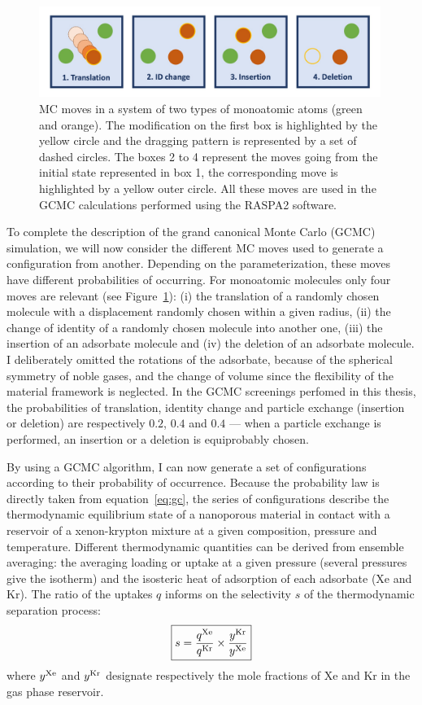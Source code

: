 \documentclass[main.tex]{subfiles}
\begin{document}
\begin{figure}[ht]
  \centering
  \includegraphics[width=0.99\textwidth]{figures/2-thermo/MC_moves.jpg}
  \caption{MC moves in a system of two types of monoatomic atoms (green and orange). The modification on the first box is highlighted by the yellow circle and the dragging pattern is represented by a set of dashed circles. The boxes 2 to 4 represent the moves going from the initial state represented in box 1, the corresponding move is highlighted by a yellow outer circle. All these moves are used in the GCMC calculations performed using the RASPA2 software. }\label{fgr:mc}
\end{figure}

To complete the description of the grand canonical Monte Carlo (GCMC) simulation, we will now consider the different MC moves used to generate a configuration from another. Depending on the parameterization, these moves have different probabilities of occurring. For monoatomic molecules only four moves are relevant (see Figure~\ref{fgr:mc}): (i) the translation of a randomly chosen molecule with a displacement randomly chosen within a given radius, (ii) the change of identity of a randomly chosen molecule into another one, (iii) the insertion of an adsorbate molecule and (iv) the deletion of an adsorbate molecule. I deliberately omitted the rotations of the adsorbate, because of the spherical symmetry of noble gases, and the change of volume since the flexibility of the material framework is neglected. In the GCMC screenings perfomed in this thesis, the probabilities of translation, identity change and particle exchange (insertion or deletion) are respectively $0.2$, $0.4$ and $0.4$ --- when a particle exchange is performed, an insertion or a deletion is equiprobably chosen.

By using a GCMC algorithm, I can now generate a set of configurations according to their probability of occurrence. Because the probability law is directly taken from equation~\ref{eq:gc}, the series of configurations describe the thermodynamic equilibrium state of a nanoporous material in contact with a reservoir of a xenon-krypton mixture at a given composition, pressure and temperature. Different thermodynamic quantities can be derived from ensemble averaging: the averaging loading or uptake at a given pressure (several pressures give the isotherm) and the isosteric heat of adsorption of each adsorbate (Xe and Kr). The ratio of the uptakes $q$ informs on the selectivity $s$ of the thermodynamic separation process: 
\begin{equation}\label{eq:selec}
  \boxed{
  s = \dfrac{q^{\text{Xe}}}{q^{\text{Kr}}}\times\dfrac{y^{\text{Kr}}}{y^{\text{Xe}}}
  }
\end{equation}
where $y^{\text{Xe}}$ and $y^{\text{Kr}}$ designate respectively the mole fractions of Xe and Kr in the gas phase reservoir.
\end{document}
